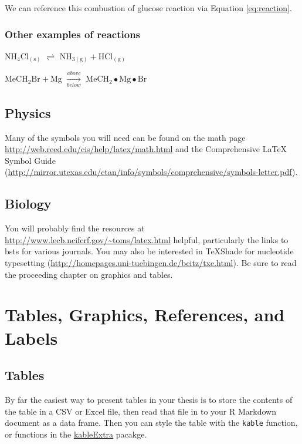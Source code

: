 \documentclass[print]{nuthesis}
\begin{document}
We can reference this combustion of glucose reaction via Equation \eqref{eq:reaction}.

\hypertarget{other-examples-of-reactions}{%
\subsection{Other examples of reactions}\label{other-examples-of-reactions}}

\(\mathrm{NH_4Cl_{(s)}}\) \(\rightleftharpoons\) \(\mathrm{NH_{3(g)}+HCl_{(g)}}\)

\noindent \(\mathrm{MeCH_2Br + Mg}\) \(\xrightarrow[below]{above}\) \(\mathrm{MeCH_2\bullet Mg \bullet Br}\)

\hypertarget{physics}{%
\section{Physics}\label{physics}}

Many of the symbols you will need can be found on the math page \url{http://web.reed.edu/cis/help/latex/math.html} and the Comprehensive LaTeX Symbol Guide (\url{http://mirror.utexas.edu/ctan/info/symbols/comprehensive/symbols-letter.pdf}).

\hypertarget{biology}{%
\section{Biology}\label{biology}}

You will probably find the resources at \url{http://www.lecb.ncifcrf.gov/~toms/latex.html} helpful, particularly the links to bsts for various journals. You may also be interested in TeXShade for nucleotide typesetting (\url{http://homepages.uni-tuebingen.de/beitz/txe.html}). Be sure to read the proceeding chapter on graphics and tables.

\hypertarget{ref-labels}{%
\chapter{Tables, Graphics, References, and Labels}\label{ref-labels}}

\hypertarget{tables}{%
\section{Tables}\label{tables}}

By far the easiest way to present tables in your thesis is to store the contents of the table in a CSV or Excel file, then read that file in to your R Markdown document as a data frame. Then you can style the table with the \texttt{kable} function, or functions in the \href{https://cran.r-project.org/web/packages/kableExtra/index.html}{kableExtra} pacakge.
\end{document}
